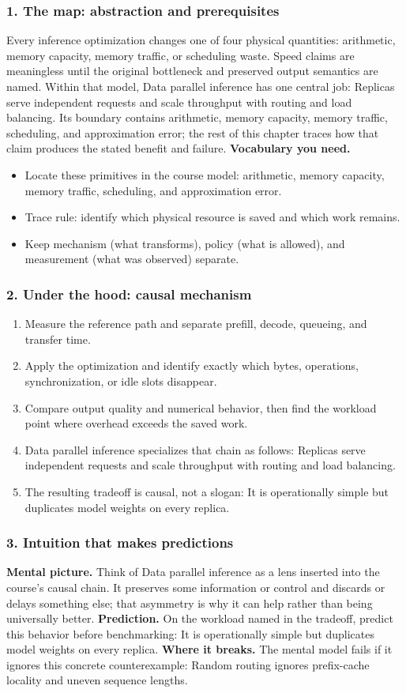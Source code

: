 \subsubsection*{1. The map: abstraction and prerequisites}
Every inference optimization changes one of four physical quantities: arithmetic, memory capacity, memory traffic, or scheduling waste. Speed claims are meaningless until the original bottleneck and preserved output semantics are named.
Within that model, Data parallel inference has one central job: Replicas serve independent requests and scale throughput with routing and load balancing. Its boundary contains arithmetic, memory capacity, memory traffic, scheduling, and approximation error; the rest of this chapter traces how that claim produces the stated benefit and failure.
\textbf{Vocabulary you need.}\begin{itemize}
\item Locate these primitives in the course model: arithmetic, memory capacity, memory traffic, scheduling, and approximation error.
\item Trace rule: identify which physical resource is saved and which work remains.
\item Keep mechanism (what transforms), policy (what is allowed), and measurement (what was observed) separate.
\end{itemize}
\subsubsection*{2. Under the hood: causal mechanism}\begin{enumerate}
\item Measure the reference path and separate prefill, decode, queueing, and transfer time.
\item Apply the optimization and identify exactly which bytes, operations, synchronization, or idle slots disappear.
\item Compare output quality and numerical behavior, then find the workload point where overhead exceeds the saved work.
\item Data parallel inference specializes that chain as follows: Replicas serve independent requests and scale throughput with routing and load balancing.
\item The resulting tradeoff is causal, not a slogan: It is operationally simple but duplicates model weights on every replica.
\end{enumerate}
\subsubsection*{3. Intuition that makes predictions}
\textbf{Mental picture.} Think of Data parallel inference as a lens inserted into the course's causal chain. It preserves some information or control and discards or delays something else; that asymmetry is why it can help rather than being universally better.
\textbf{Prediction.} On the workload named in the tradeoff, predict this behavior before benchmarking: It is operationally simple but duplicates model weights on every replica.
\textbf{Where it breaks.} The mental model fails if it ignores this concrete counterexample: Random routing ignores prefix-cache locality and uneven sequence lengths.
